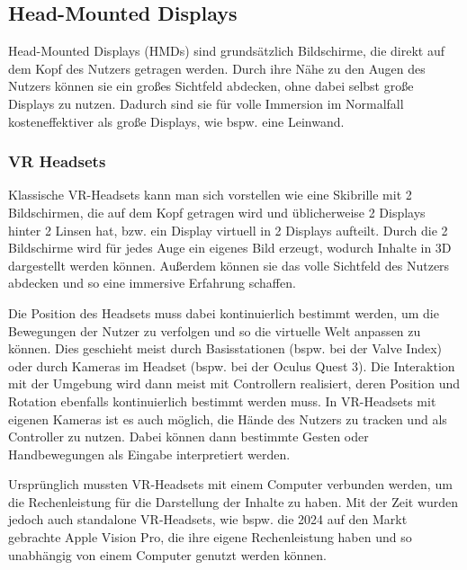   \subsection{Head-Mounted Displays}
    Head-Mounted Displays (HMDs) sind grundsätzlich Bildschirme, die direkt auf dem Kopf des Nutzers getragen werden.
    Durch ihre Nähe zu den Augen des Nutzers können sie ein großes Sichtfeld abdecken, ohne dabei selbst große Displays zu nutzen.
    Dadurch sind sie für volle Immersion im Normalfall kosteneffektiver als große Displays, wie bspw. eine Leinwand.


    \subsubsection{VR Headsets}

    Klassische VR-Headsets kann man sich vorstellen wie eine Skibrille mit 2 Bildschirmen, die auf dem Kopf getragen wird und üblicherweise 2 Displays hinter 2 Linsen hat, bzw. ein Display virtuell in 2 Displays aufteilt.
    Durch die 2 Bildschirme wird für jedes Auge ein eigenes Bild erzeugt, wodurch Inhalte in 3D dargestellt werden können.
    Außerdem können sie das volle Sichtfeld des Nutzers abdecken und so eine immersive Erfahrung schaffen.

    Die Position des Headsets muss dabei kontinuierlich bestimmt werden, um die Bewegungen der Nutzer zu verfolgen und so die virtuelle Welt anpassen zu können.
    Dies geschieht meist durch Basisstationen (bspw. bei der Valve Index) oder durch Kameras im Headset (bspw. bei der Oculus Quest 3).
    Die Interaktion mit der Umgebung wird dann meist mit Controllern realisiert, deren Position und Rotation ebenfalls kontinuierlich bestimmt werden muss.
    In VR-Headsets mit eigenen Kameras ist es auch möglich, die Hände des Nutzers zu tracken und als Controller zu nutzen.
    Dabei können dann bestimmte Gesten oder Handbewegungen als Eingabe interpretiert werden.
    
    Ursprünglich mussten VR-Headsets mit einem Computer verbunden werden, um die Rechenleistung für die Darstellung der Inhalte zu haben.
    Mit der Zeit wurden jedoch auch standalone VR-Headsets, wie bspw. die 2024 auf den Markt gebrachte Apple Vision Pro, die ihre eigene Rechenleistung haben und so unabhängig von einem Computer genutzt werden können.


